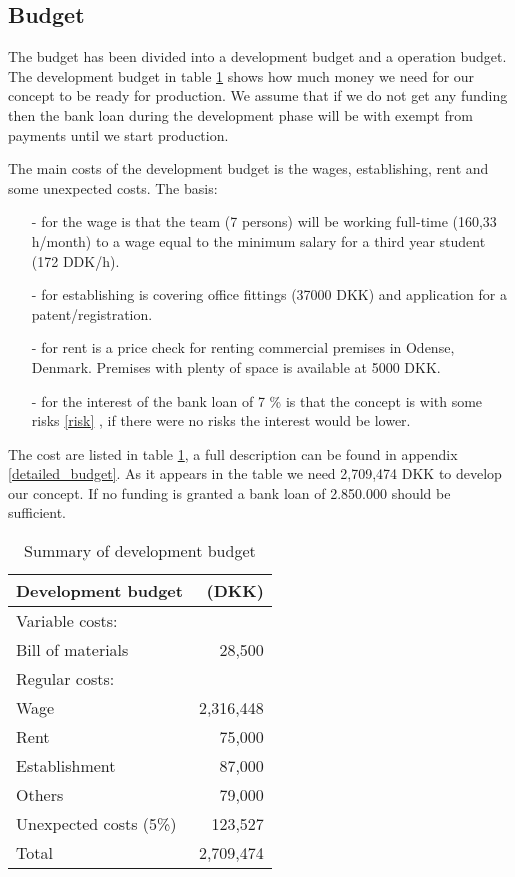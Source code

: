 \subsection{Budget}
\label{budget_label}
The budget has been divided into a development budget and a operation budget. 
The development budget in table \ref{devbud} shows how much money we need for our concept to be ready for production. 
We assume that if we do not get any funding then the bank loan during the development phase will be with exempt from payments until we start production. 

The main costs of the development budget is the wages, establishing, rent and some unexpected costs. 
The basis: \begin{itemize}
\item[-] for the wage is that the team (7 persons) will be working full-time (160,33 h/month) to a wage equal to the minimum salary for a third year student (172 DDK/h\cite{ida-salary}).
\item[-] for establishing is covering office fittings (37000 DKK) and application for a patent/registration.
\item[-] for rent is a price check for renting commercial premises in Odense, Denmark. Premises with plenty of space is available at 5000 DKK.\cite{rent_prices}
\item[-] for the interest of the bank loan of 7 \% is that the concept is with some risks \ref{risk} , if there were no risks the interest would be lower. 
\end{itemize} 
The cost are listed in table \ref{devbud}, a full description can be found in appendix \ref{detailed_budget}. 
As it appears in the table we need 2,709,474 DKK to develop our concept. 
If no funding is granted a bank loan of 2.850.000 should be sufficient.

\begin{table}[h!]
\centering
\begin{tabular}{l r}
Development budget      & (DKK)              \\
\hline                                       
Variable costs:         &                    \\
Bill of materials       &    28,500        \\
Regular costs:          &                           \\
Wage                    &    2,316,448           \\
Rent                    &    75,000          \\
Establishment           &    87,000          \\
Others                  &    79,000          \\
Unexpected costs (5\%)  &    123,527         \\
\hline                      
Total                   &    2,709,474           \\
\end{tabular}
\caption{Summary of development budget}
\label{devbud}
\end{table}

